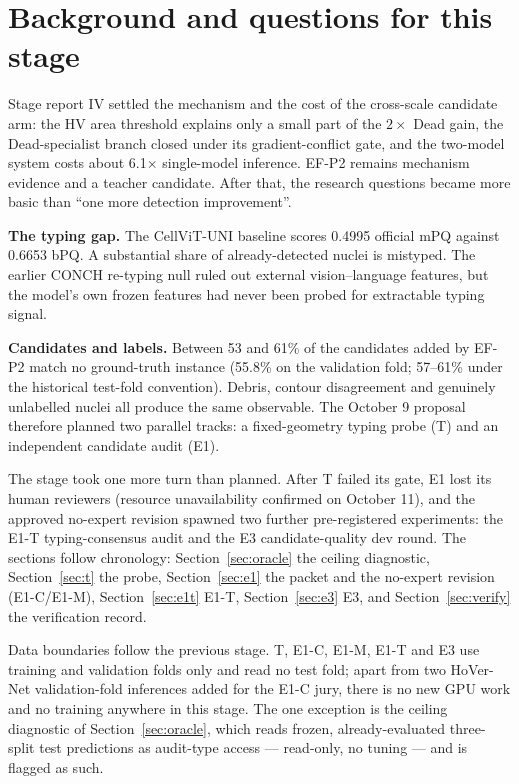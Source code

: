 \documentclass[11pt,a4paper]{article}
\begin{document}
\section{Background and questions for this stage}

Stage report IV settled the mechanism and the cost of the cross-scale candidate arm\cite{reports}: the HV area threshold explains only a small part of the $2\times$ Dead gain, the Dead-specialist branch closed under its gradient-conflict gate, and the two-model system costs about 6.1$\times$ single-model inference. EF-P2 remains mechanism evidence and a teacher candidate. After that, the research questions became more basic than ``one more detection improvement''.

\textbf{The typing gap.} The CellViT-UNI baseline scores 0.4995 official mPQ against 0.6653 bPQ. A substantial share of already-detected nuclei is mistyped. The earlier CONCH re-typing null\cite{structure} ruled out external vision--language features, but the model's own frozen features had never been probed for extractable typing signal.

\textbf{Candidates and labels.} Between 53 and 61\% of the candidates added by EF-P2 match no ground-truth instance (55.8\% on the validation fold; 57--61\% under the historical test-fold convention). Debris, contour disagreement and genuinely unlabelled nuclei all produce the same observable. The October 9 proposal\cite{next} therefore planned two parallel tracks: a fixed-geometry typing probe (T) and an independent candidate audit (E1).

The stage took one more turn than planned. After T failed its gate, E1 lost its human reviewers (resource unavailability confirmed on October 11), and the approved no-expert revision spawned two further pre-registered experiments\cite{specs}: the E1-T typing-consensus audit and the E3 candidate-quality dev round. The sections follow chronology: Section~\ref{sec:oracle} the ceiling diagnostic, Section~\ref{sec:t} the probe, Section~\ref{sec:e1} the packet and the no-expert revision (E1-C/E1-M), Section~\ref{sec:e1t} E1-T, Section~\ref{sec:e3} E3, and Section~\ref{sec:verify} the verification record.

Data boundaries follow the previous stage. T, E1-C, E1-M, E1-T and E3 use training and validation folds only and read no test fold; apart from two HoVer-Net validation-fold inferences added for the E1-C jury, there is no new GPU work and no training anywhere in this stage. The one exception is the ceiling diagnostic of Section~\ref{sec:oracle}, which reads frozen, already-evaluated three-split test predictions as audit-type access --- read-only, no tuning --- and is flagged as such.
\end{document}
